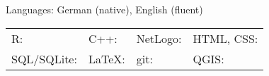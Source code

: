 \documentclass[hidelinks]{report}
\begin{document}
Languages: German (native), English (fluent)

\begin{center}
	\begin{tabular}{l l l l}
		
		R: \textcolor{green}{\faCircle \faCircle \faCircle \faCircle \faCircle} & 
		C++: \textcolor{green}{\faCircle \faCircle \faCircle \faCircleO \faCircleO} & 
		NetLogo: \textcolor{green}{\faCircle \faCircle \faCircleO \faCircleO \faCircleO} &
		HTML, CSS: \textcolor{green}{\faCircle \faCircleO \faCircleO \faCircleO \faCircleO} \\
	
		SQL/SQLite: \textcolor{green}{\faCircle \faCircleO \faCircleO \faCircleO \faCircleO} &
		LaTeX: \textcolor{green}{\faCircle \faCircle \faCircle \faCircleO \faCircleO} &
		git: \textcolor{green}{\faCircle \faCircle \faCircle \faCircleO \faCircleO} &
		QGIS: \textcolor{green}{\faCircle \faCircle \faCircleO \faCircleO \faCircleO} \\

	\end{tabular}
\end{center}
\end{document}
